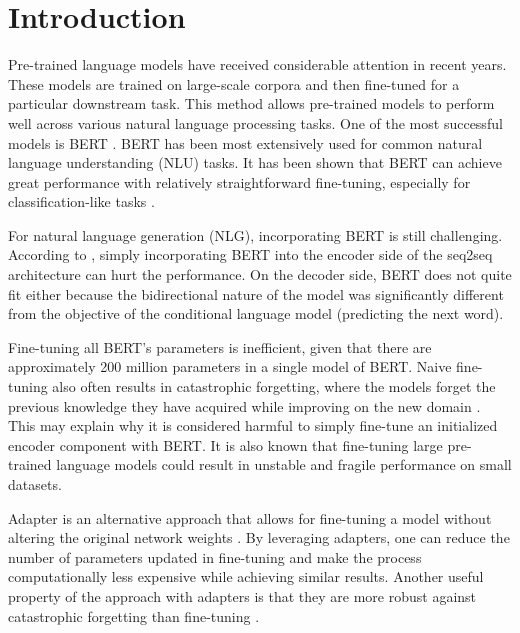 \chapter*{Introduction}
Pre-trained language models  have received considerable attention in recent years. These models are trained on large-scale corpora and then fine-tuned for a particular downstream task. This method allows pre-trained models to perform well across various natural language processing tasks. One of the most successful models is BERT . BERT has been most extensively used for common natural language understanding (NLU) tasks. It has been shown that BERT can achieve great performance with relatively straightforward fine-tuning, especially for classification-like tasks .


For natural language generation (NLG), incorporating BERT is still challenging. According to , simply incorporating BERT into the encoder side of the seq2seq architecture can hurt the performance. On the decoder side, BERT does not quite fit either because the bidirectional nature of the model was significantly different from the objective of the conditional language model (predicting the next word).

Fine-tuning all BERT's parameters is inefficient, given that there are approximately 200 million parameters in a single model of BERT. Naive fine-tuning also often results in catastrophic forgetting, where the models forget the previous knowledge they have acquired while improving on the new domain . This may explain why it is considered harmful to simply fine-tune an initialized encoder component with BERT. It is also known that fine-tuning large pre-trained language models could result in unstable and fragile performance on small datasets.

Adapter is an alternative approach that allows for fine-tuning a model without altering the original network weights . By leveraging adapters, one can reduce the number of parameters updated in fine-tuning and make the process computationally less expensive while achieving similar results. Another useful property of the approach with adapters is that they are more robust against catastrophic forgetting than fine-tuning .

